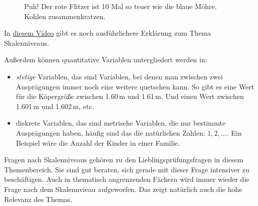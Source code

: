 \documentclass[
  a4paper,
  DIV=11]{scrreprt}
\providecommand{\tightlist}{%
  \setlength{\itemsep}{0pt}\setlength{\parskip}{0pt}}\usepackage{longtable,booktabs,array}
\theoremstyle{definition}
\theoremstyle{definition}
\theoremstyle{definition}
\theoremstyle{remark}
\begin{document}
\begin{figure}


\caption{\label{fig-verhaeltnis}Puh! Der rote Flitzer ist 10 Mal so
teuer wie die blaue Möhre. Kohlen zusammenkratzen.}

\end{figure}%

In \href{https://www.youtube.com/watch?v=_mN3kFe56ng}{diesem Video} gibt
es noch ausführlichere Erklärung zum Thema Skalenniveaus.

Außerdem können quantitative Variablen untergliedert werden in:

\begin{itemize}
\tightlist
\item
  \emph{stetige} Variablen, das sind Variablen, bei denen man zwischen
  zwei Ausprägungen immer noch eine weitere quetschen kann. So gibt es
  eine Wert für die Köpergröße zwischen 1.60\,m und 1.61\,m. Und einen
  Wert zwischen 1.601\,m und 1.602\,m, etc.
\item
  diskrete Variablen, das sind metrische Variablen, die nur bestimmte
  Ausprägungen haben, häufig sind das die natürlichen Zahlen:
  \(1,2,...\). Ein Beispiel wäre die Anzahl der Kinder in einer Familie.
\end{itemize}

\begin{tcolorbox}[enhanced jigsaw, leftrule=.75mm, opacitybacktitle=0.6, colback=white, colframe=quarto-callout-tip-color-frame, coltitle=black, colbacktitle=quarto-callout-tip-color!10!white, opacityback=0, left=2mm, breakable, titlerule=0mm, toptitle=1mm, bottomtitle=1mm, rightrule=.15mm, title=\textcolor{quarto-callout-tip-color}{\faLightbulb}\hspace{0.5em}{Tipp}, arc=.35mm, bottomrule=.15mm, toprule=.15mm]

Fragen nach Skalenniveaus gehören zu den Lieblingsprüfungsfragen in
diesem Themenbereich. Sie sind gut beraten, sich gerade mit dieser Frage
intensiver zu beschäftigen. Auch in thematisch angrenzenden Fächern wird
immer wieder die Frage nach dem Skalennvieau aufgeworfen. Das zeigt
natürlich auch die hohe Relevanz des Themas.

\end{tcolorbox}
\end{document}

